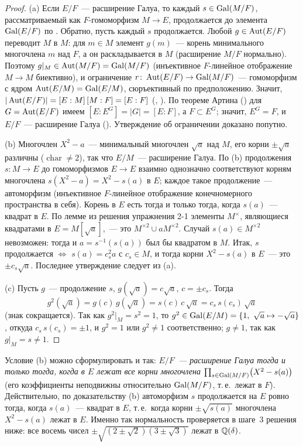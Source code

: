 \begin{proof}
(a) Если $E/F$~--- расширение Галуа, то каждый $s\in\operatorname{Gal}(M/F)$, рассматриваемый как $F$-гомоморфизм $M\to E$,
продолжается до элемента $\operatorname{Gal}(E/F)$ по . Обратно, пусть каждый $s$ продолжается. Любой $g\in\operatorname{Aut}(E/F)$
переводит $M$ в $M$: для $m\in M$ элемент $g(m)$~--- корень минимального многочлена $m$ над $F$, а он раскладывается в $M$
(расширение $M/F$ нормально). Поэтому $g|_M\in\operatorname{Aut}(M/F)=\operatorname{Gal}(M/F)$ (инъективное $F$-линейное отображение $M\to M$
биективно), и ограничение $r\colon\operatorname{Aut}(E/F)\to\operatorname{Gal}(M/F)$~--- гомоморфизм с ядром $\operatorname{Aut}(E/M)=\operatorname{Gal}(E/M)$, сюръективный по
предположению. Значит, $|\operatorname{Aut}(E/F)|=[E:M]\,[M:F]=[E:F]$ (, ). По теореме Артина () для
$G=\operatorname{Aut}(E/F)$ имеем $[E:E^G]=|G|=[E:F]$, а $F\subset E^G$; значит, $E^G=F$, и $E/F$~--- расширение Галуа ().
Утверждение об ограничении доказано попутно.

(b) Многочлен $X^2-a$~--- минимальный многочлен $\sqrt a$ над $M$, его корни $\pm\sqrt a$ различны ($\operatorname{char}\ne2$),
так что $E/M$~--- расширение Галуа. По (b) продолжения $s\colon M\to E$ до гомоморфизмов $E\to E$ взаимно
однозначно соответствуют корням многочлена $s(X^2-a)=X^2-s(a)$ в $E$; каждое такое продолжение~--- автоморфизм (инъективное
$F$-линейное отображение конечномерного пространства в себя). Корень в $E$ есть тогда и только тогда, когда $s(a)$~---
квадрат в $E$. По лемме из решения упражнения 2-1 элементы $M^\times$, являющиеся квадратами в $E=M[\sqrt a]$,~--- это
$M^{\times2}\cup aM^{\times2}$. Случай $s(a)\in M^{\times2}$ невозможен: тогда и $a=s^{-1}(s(a))$ был бы квадратом в $M$.
Итак, $s$ продолжается $\iff$ $s(a)=c_s^2a$ с $c_s\in M$, и тогда корни $X^2-s(a)$ в $E$~--- это $\pm c_s\sqrt a$.
Последнее утверждение следует из (a).

(c) Пусть $g$~--- продолжение $s$, $g(\sqrt a)=c\sqrt a$, $c=\pm c_s$. Тогда
\[
g^2(\sqrt a)=g(c)\,g(\sqrt a)=s(c)\,c\,\sqrt a=c_s\,s(c_s)\,\sqrt a
\]
(знак сокращается). Так как $g^2|_M=s^2=1$, то $g^2\in\operatorname{Gal}(E/M)=\{1,\ \sqrt a\mapsto-\sqrt a\}$, откуда $c_s\,s(c_s)=\pm1$, и
$g^2=1$ или $g^2\ne1$ соответственно; $g\ne1$, так как $g|_M=s\ne1$.
\end{proof}

Условие (b) можно сформулировать и так: \emph{$E/F$~--- расширение Галуа тогда и только тогда, когда в $E$ лежат все
корни многочлена $\prod_{s\in\operatorname{Gal}(M/F)}\bigl(X^2-s(a)\bigr)$} (его коэффициенты неподвижны относительно $\operatorname{Gal}(M/F)$, т.\,е.\
лежат в $F$). Действительно, по доказательству (b) автоморфизм $s$ продолжается на $E$ ровно тогда, когда $s(a)$~--- квадрат
в $E$, т.\,е.\ когда корни $\pm\sqrt{s(a)}$ многочлена $X^2-s(a)$ лежат в $E$. Именно так нормальность проверяется в шаге~3
решения ниже: все восемь чисел $\pm\sqrt{(2\pm\sqrt2)(3\pm\sqrt3)}$ лежат в $\mathbb Q(\delta)$.


